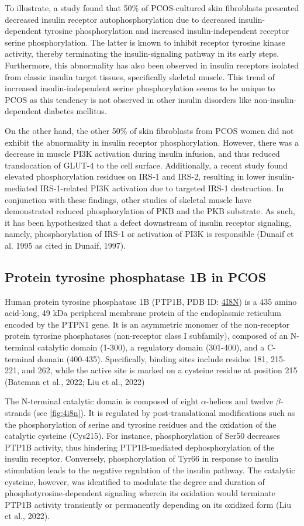 To illustrate, a study found that 50\% of PCOS-cultured skin fibroblasts presented decreased insulin receptor autophosphorylation due to decreased insulin-dependent tyrosine phosphorylation and increased insulin-independent receptor serine phosphorylation. The latter is known to inhibit receptor tyrosine kinase activity, thereby terminating the insulin-signaling pathway in its early steps. Furthermore, this abnormality has also been observed in insulin receptors isolated from classic insulin target tissues, specifically skeletal muscle. This trend of increased insulin-independent serine phosphorylation seems to be unique to PCOS as this tendency is not observed in other insulin disorders like non-insulin-dependent diabetes mellitus. 

On the other hand, the other 50\% of skin fibroblasts from PCOS women did not exhibit the abnormality in insulin receptor phosphorylation. However, there was a decrease in muscle PI3K activation during insulin infusion, and thus reduced translocation of GLUT-4 to the cell surface. Additionally, a recent study found elevated phosphorylation residues on IRS-1 and IRS-2, resulting in lower insulin-mediated IRS-1-related PI3K activation due to targeted IRS-1 destruction. In conjunction with these findings, other studies of skeletal muscle have demonstrated reduced phosphorylation of PKB and the PKB substrate. As such, it has been hypothesized that a defect downstream of insulin receptor signaling, namely, phosphorylation of IRS-1 or activation of PI3K is responsible (Dunaif et al. 1995 as cited in Dunaif, 1997).

\subsection{Protein tyrosine phosphatase 1B in PCOS}
Human protein tyrosine phosphatase 1B (PTP1B, PDB ID: \href{https://www.rcsb.org/structure/4I8N}{4I8N}) is a 435 amino acid-long, 49 kDa peripheral membrane protein of the endoplasmic reticulum encoded by the PTPN1 gene. It is an asymmetric monomer of the non-receptor protein tyrosine phosphatases (non-receptor class I subfamily), composed of an N-terminal catalytic domain (1-300), a regulatory domain (301-400), and a C-terminal domain (400-435). Specifically, binding sites include residue 181, 215-221, and 262, while the active site is marked on a cysteine residue at position 215 (Bateman et al., 2022; Liu et al., 2022)

The N-terminal catalytic domain is composed of eight $\alpha$-helices and twelve $\beta$-strands (see \ref{fig:4i8n}).  It is regulated by post-translational modifications such as the phosphorylation of serine and tyrosine residues and the oxidation of the catalytic cysteine (Cys215). For instance, phosphorylation of Ser50 decreases PTP1B activity, thus hindering PTP1B-mediated dephosphorylation of the insulin receptor. Conversely, phosphorylation of Tyr66 in response to insulin stimulation leads to the negative regulation of the insulin pathway. The catalytic cysteine, however, was identified to modulate the degree and duration of phosphotyrosine-dependent signaling wherein its oxidation would terminate PTP1B activity transiently or permanently depending on its oxidized form (Liu et al., 2022).  

